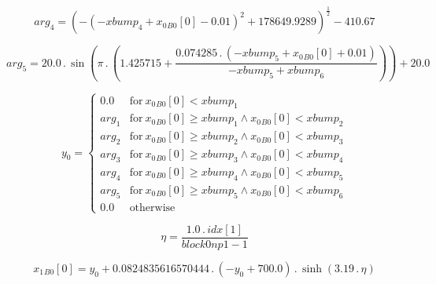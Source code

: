 \documentclass{article}
\begin{document}
\begin{dmath}arg_{4} = \left(- \left(- xbump_{4} + {x_{0}{_{B0}}}[{0}] - 0.01 \right)^{2} + 178649.9289 \right)^{\frac{1}{2}} - 410.67\end{dmath}

\begin{dmath}arg_{5} = 20.0 \,.\, \sin{\left (\pi \,.\, \left(1.425715 + \frac{0.074285 \,.\, \left(- xbump_{5} + {x_{0}{_{B0}}}[{0}] + 0.01\right)}{- xbump_{5} + xbump_{6}}\right) \right )} + 20.0\end{dmath}

\begin{dmath}y_{0} = \begin{cases} 0.0 & \text{for}\: {x_{0}{_{B0}}}[{0}] < xbump_{1} \\arg_{1} & \text{for}\: {x_{0}{_{B0}}}[{0}] \geq xbump_{1} \wedge {x_{0}{_{B0}}}[{0}] < xbump_{2} \\arg_{2} & \text{for}\: {x_{0}{_{B0}}}[{0}] \geq xbump_{2} 
\wedge {x_{0}{_{B0}}}[{0}] < xbump_{3} \\arg_{3} & \text{for}\: {x_{0}{_{B0}}}[{0}] \geq xbump_{3} \wedge {x_{0}{_{B0}}}[{0}] < xbump_{4} \\arg_{4} & \text{for}\: {x_{0}{_{B0}}}[{0}] \geq xbump_{4} \wedge {x_{0}{_{B0}}}[{0}] < xbump_{5} \\arg_{5} & 
\text{for}\: {x_{0}{_{B0}}}[{0}] \geq xbump_{5} \wedge {x_{0}{_{B0}}}[{0}] < xbump_{6} \\0.0 & \text{otherwise} \end{cases}\end{dmath}

\begin{dmath}\eta = \frac{1.0 \,.\, {idx}[{1}]}{block0np1 - 1}\end{dmath}

\begin{dmath}{x_{1}{_{B0}}}[{0}] = y_{0} + 0.0824835616570444 \,.\, \left(- y_{0} + 700.0\right) \,.\, \sinh{\left (3.19 \,.\, \eta \right )}\end{dmath}
\end{document}
